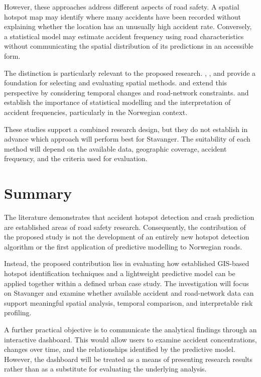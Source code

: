 However, these approaches address different aspects of road safety. A spatial hotspot map may identify where many accidents have been recorded without explaining whether the location has an unusually high accident rate. Conversely, a statistical model may estimate accident frequency using road characteristics without communicating the spatial distribution of its predictions in an accessible form.

The distinction is particularly relevant to the proposed research. \textcite{Anderson2009}, \textcite{AlAamri2021}, and \textcite{Zahran2021} provide a foundation for selecting and evaluating spatial methods. \textcite{AlHamami2021} and \textcite{Romano2017} extend this perspective by considering temporal changes and road-network constraints. \textcite{Elvik2008} and \textcite{ElvikHoye2023} establish the importance of statistical modelling and the interpretation of accident frequencies, particularly in the Norwegian context.

These studies support a combined research design, but they do not establish in advance which approach will perform best for Stavanger. The suitability of each method will depend on the available data, geographic coverage, accident frequency, and the criteria used for evaluation.

\section{Summary}
\label{sec:lit-summary}
The literature demonstrates that accident hotspot detection and crash prediction are established areas of road safety research. Consequently, the contribution of the proposed study is not the development of an entirely new hotspot detection algorithm or the first application of predictive modelling to Norwegian roads.

Instead, the proposed contribution lies in evaluating how established GIS-based hotspot identification techniques and a lightweight predictive model can be applied together within a defined urban case study. The investigation will focus on Stavanger and examine whether available accident and road-network data can support meaningful spatial analysis, temporal comparison, and interpretable risk profiling.

A further practical objective is to communicate the analytical findings through an interactive dashboard. This would allow users to examine accident concentrations, changes over time, and the relationships identified by the predictive model. However, the dashboard will be treated as a means of presenting research results rather than as a substitute for evaluating the underlying analysis.

